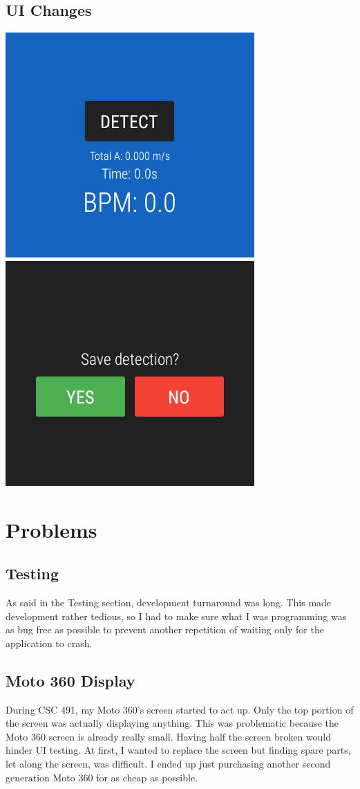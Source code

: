 \documentclass[12pt]{article}
\begin{document}
\subsection{UI Changes}
\begin{center}
\includegraphics[width=.4\textwidth]{bpm11.png}
\includegraphics[width=.4\textwidth]{bpm12.png}
\end{center}

\section{Problems}
\subsection{Testing}
As said in the Testing section, development turnaround was long. This made development rather tedious, so I had to make sure what I was programming was as bug free as possible to prevent another repetition of waiting only for the application to crash.

\subsection{Moto 360 Display}
During CSC 491, my Moto 360's screen started to act up. Only the top portion of the screen was actually displaying anything. This was problematic because the Moto 360 screen is already really small. Having half the screen broken would hinder UI testing. At first, I wanted to replace the screen but finding spare parts, let along the screen, was difficult. I ended up just purchasing another second generation Moto 360 for as cheap as possible.
\end{document}
